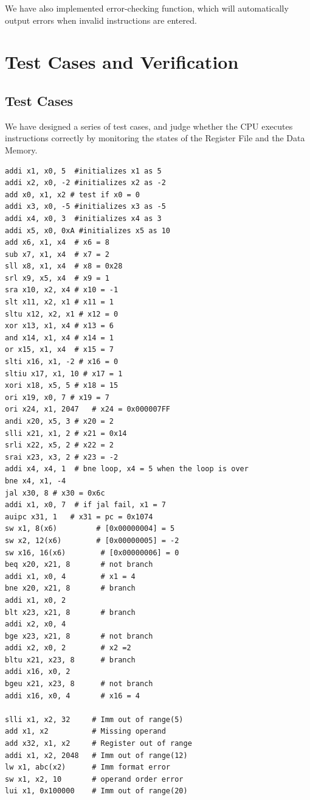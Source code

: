 \documentclass[11pt]{article}
\begin{document}
We have also implemented error-checking function, which will automatically output errors when invalid instructions are entered.


\section{Test Cases and Verification}
\subsection{Test Cases}
We have designed a series of test cases, and judge whether the CPU executes instructions correctly by monitoring the states of the Register File and the Data Memory.
\begin{lstlisting}[style=myriscv, caption=RV32I Test Cases 1, label=lst:testcases1]
addi x1, x0, 5  #initializes x1 as 5
addi x2, x0, -2 #initializes x2 as -2  
add x0, x1, x2 # test if x0 = 0
addi x3, x0, -5 #initializes x3 as -5
addi x4, x0, 3  #initializes x4 as 3
addi x5, x0, 0xA #initializes x5 as 10
add x6, x1, x4  # x6 = 8
sub x7, x1, x4  # x7 = 2
sll x8, x1, x4  # x8 = 0x28
srl x9, x5, x4  # x9 = 1
sra x10, x2, x4 # x10 = -1
slt x11, x2, x1 # x11 = 1
sltu x12, x2, x1 # x12 = 0
xor x13, x1, x4 # x13 = 6
and x14, x1, x4 # x14 = 1
or x15, x1, x4  # x15 = 7
slti x16, x1, -2 # x16 = 0
sltiu x17, x1, 10 # x17 = 1
xori x18, x5, 5 # x18 = 15
ori x19, x0, 7 # x19 = 7
ori x24, x1, 2047   # x24 = 0x000007FF
andi x20, x5, 3 # x20 = 2
slli x21, x1, 2 # x21 = 0x14
srli x22, x5, 2 # x22 = 2
srai x23, x3, 2 # x23 = -2
addi x4, x4, 1  # bne loop, x4 = 5 when the loop is over
bne x4, x1, -4 
jal x30, 8 # x30 = 0x6c
addi x1, x0, 7  # if jal fail, x1 = 7
auipc x31, 1   # x31 = pc = 0x1074
sw x1, 8(x6)         # [0x00000004] = 5
sw x2, 12(x6)        # [0x00000005] = -2
sw x16, 16(x6)        # [0x00000006] = 0
beq x20, x21, 8       # not branch
addi x1, x0, 4        # x1 = 4
bne x20, x21, 8       # branch
addi x1, x0, 2        
blt x23, x21, 8       # branch
addi x2, x0, 4        
bge x23, x21, 8       # not branch
addi x2, x0, 2        # x2 =2
bltu x21, x23, 8      # branch
addi x16, x0, 2       
bgeu x21, x23, 8      # not branch
addi x16, x0, 4       # x16 = 4

slli x1, x2, 32     # Imm out of range(5)
add x1, x2          # Missing operand
add x32, x1, x2     # Register out of range
addi x1, x2, 2048   # Imm out of range(12)
lw x1, abc(x2)      # Imm format error
sw x1, x2, 10       # operand order error
lui x1, 0x100000    # Imm out of range(20)
\end{lstlisting}
\end{document}
